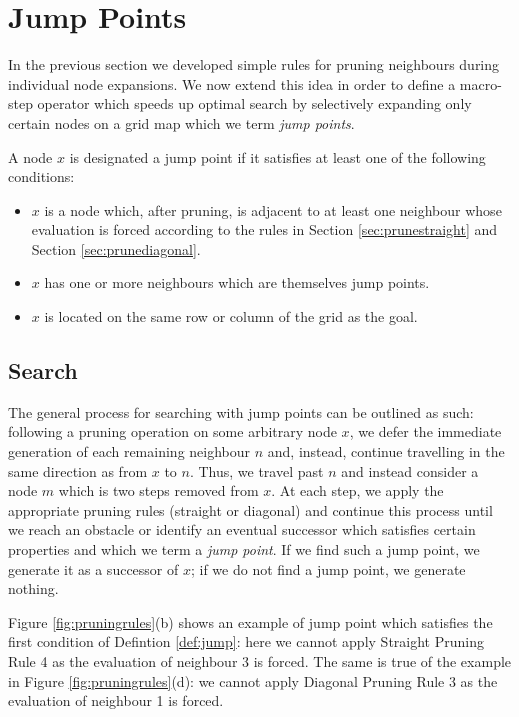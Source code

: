 \section{Jump Points}
In the previous section we developed simple rules for pruning neighbours during 
individual node expansions. We now extend this idea in order to define a 
macro-step operator which speeds up optimal search by selectively expanding
only certain nodes on a grid map which we term \emph{jump points}.

\begin{definition}
\label{def:jump}
A node $x$ is designated a jump point if it satisfies at least one of the following
conditions:
\begin{itemize}
\item{$x$ is a node which, after pruning, is adjacent to at least one neighbour
whose evaluation is forced according to the rules in Section
\ref{sec:prunestraight} and Section \ref{sec:prunediagonal}.}
\item{$x$ has one or more neighbours which are themselves jump points.}
\item{$x$ is located on the same row or column of the grid as the goal.}
\end{itemize}
\end{definition}


\subsection{Search}

The general process for searching with jump points can be outlined as 
such: following a pruning operation on some arbitrary node $x$, we defer the immediate 
generation of each remaining neighbour $n$ and, instead, continue travelling in the same direction as from $x$
to $n$.
Thus, we travel past $n$ and instead consider a node $m$ which is two steps
removed from $x$.
At each step, we apply the appropriate pruning rules (straight or
diagonal) and continue this process until we reach an obstacle or identify an 
eventual successor which satisfies certain properties and which we term a 
\emph{jump point}.
If we find such a jump point, we generate it as a successor of $x$; if we do not 
find a jump point, we generate nothing.


\noindent
Figure \ref{fig:pruningrules}(b) shows an example of jump point which satisfies the
first condition of Defintion \ref{def:jump}: here we cannot apply Straight Pruning
Rule 4 as the evaluation of neighbour 3 is forced.
The same is true of the example in Figure \ref{fig:pruningrules}(d): we cannot
apply Diagonal Pruning Rule 3 as the evaluation of neighbour 1 is forced.

